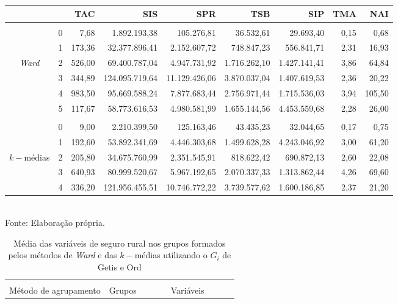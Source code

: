 \documentclass[
	12pt,				%
	openright,			%
	oneside,			%
	a4paper,			%
	chapter=TITLE,		%
	section=TITLE,		%
	english,			%
	french,				%
	spanish,			%
	brazil				%
	]{abntex2}
\begin{document}
\begin{apendicesenv}
\begin{table}
\begin{tabular}{ccrrrrrrr}
                      &   & TAC   & SIS   & SPR   & TSB   & SIP  & TMA   & NAI   \\
        \hline \\[-1.9ex]	 
                              & 0      &   7,68 &    1.892.193,38 &    105.276,81 &    36.532,61 &    29.693,40 & 0,15 &  0,68 \\
                              & 1      & 173,36 &   32.377.896,41 &  2.152.607,72 &   748.847,23 &   556.841,71 & 2,31 &  16,93 \\
        \textit{Ward}         & 2      & 526,00 &   69.400.787,04 &  4.947.731,92 & 1.716.262,10 & 1.427.141,41 & 3,86 &  64,84 \\
                              & 3      & 344,89 &  124.095.719,64 & 11.129.426,06 & 3.870.037,04 & 1.407.619,53 & 2,36 &  20,22 \\
                              & 4      & 983,50 &   95.669.588,24 &  7.877.683,44 & 2.756.971,44 & 1.715.536,03 & 3,94 & 105,50 \\
                              & 5      & 117,67 &   58.773.616,53 &  4.980.581,99 & 1.655.144,56 & 4.453.559,68 & 2,28 &  26,00 \\
        \hline \\[-1.9ex]	 
                              & 0  &    9,00 &   2.210.399,50 &     125.163,46 &      43.435,23 &      32.044,65 & 0,17 &   0,75 \\
                              & 1  &  192,60 &  53.892.341,69 &   4.446.303,68 &   1.499.628,28 &   4.243.046,92 & 3,00 &  61,20 \\
        $k-$médias            & 2  &  205,80 &  34.675.760,99 &   2.351.545,91 &     818.622,42 &     690.872,13 & 2,60 &  22,08 \\
                              & 3  &  640,93 &  80.999.520,67 &   5.967.192,65 &   2.070.337,33 &   1.313.862,44 & 4,26 &  69,60 \\
                              & 4  &  336,20 & 121.956.455,51 &  10.746.772,22 &   3.739.577,62 &   1.600.186,85 & 2,37 &  21,20 \\
        \hline 
    \end{tabular} \\
    \footnotesize{Fonte: Elaboração própria.  }
\end{table}

\begin{table}
\caption{Média das variáveis de seguro rural nos grupos formados pelos métodos de \textit{Ward} e das  $k-$médias utilizando o $G_i$ de Getis e Ord} \label{mean_I}
    \vspace{0.05cm}
    \begin{tabular}{ccrrrrrrr}
        \hline \\[-1.9ex]	 
        Método de agrupamento & Grupos & & & & Variáveis \\\cmidrule{3-9}
        

\end{tabular}
\end{table}
\end{apendicesenv}
\end{document}
